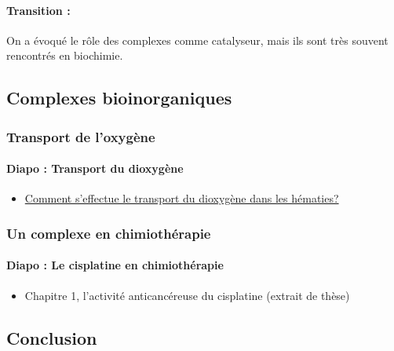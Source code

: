 \paragraph{Transition :} On a évoqué le rôle des complexes comme catalyseur, mais ils sont très souvent rencontrés en biochimie.

\subsection{Complexes bioinorganiques}

\subsubsection{Transport de l'oxygène}

\paragraph{Diapo : Transport du dioxygène}

\begin{itemize}
\item \href{https://www.rts.ch/decouverte/sante-et-medecine/corps-humain/9852272-comment-s-effectue-le-transport-du-dioxygene-dans-les-hematies-.html}{Comment s'effectue le transport du dioxygène dans les hématies?}
\end{itemize}

\subsubsection{Un complexe en chimiothérapie}

\paragraph{Diapo : Le cisplatine en chimiothérapie}
\begin{itemize}
\item Chapitre 1, l'activité anticancéreuse du cisplatine (extrait de thèse)
\end{itemize}

\subsection{Conclusion}